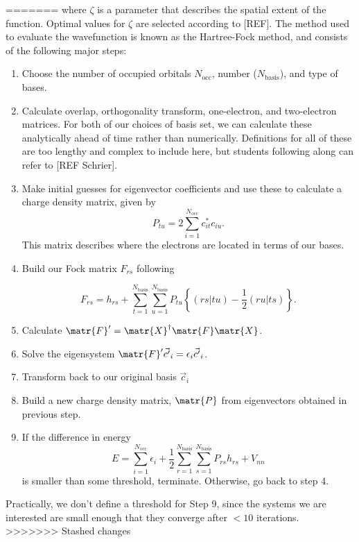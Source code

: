 \documentclass[journal=jacsat,manuscript=communication]{achemso}
\begin{document}
\begin{Abstract}
=======
where $\zeta$ is a parameter that describes the spatial extent of the function.  Optimal values for $\zeta$ are selected according to [REF].  The method used to evaluate the wavefunction is known as the Hartree-Fock method, and consists of the following major steps:
\begin{enumerate}
	\item Choose the number of occupied orbitals $N_\mathrm{occ}$, number ($N_\mathrm{basis}$), and type of bases.
	\item Calculate overlap, orthogonality transform, one-electron, and two-electron matrices.  For both of our choices of basis set, we can calculate these analytically ahead of time rather than numerically.  Definitions for all of these are too lengthy and complex to include here, but students following along can refer to [REF Schrier].
	\item Make initial guesses for eigenvector coefficients and use these to calculate a charge density matrix, given by
\begin{equation}
	P_{tu} = 2 \sum_{i=1}^{N_{\mathrm{occ}}}c^*_{it}c_{iu}.
\end{equation}
	This matrix describes where the electrons are located in terms of our bases.
	\item Build our Fock matrix $F_{rs}$ following

\begin{equation}
	F_{rs} = h_{rs} + \sum_{t=1}^{N_\mathrm{basis}}\sum_{u=1}^{N_\mathrm{basis}}P_{tu}\left\{(rs|tu) -\frac{1}{2}(ru|ts)\right\}.
\end{equation}
	\item Calculate $\matr{F}' = \matr{X}^\dag\matr{F}\matr{X}$.
	\item Solve the eigensystem $\matr{F}'\vec{c'}_i=\epsilon_i\vec{c'}_i$.
	\item Transform back to our original basis $\vec{c}_i$
	\item Build a new charge density matrix, $\matr{P}$ from eigenvectors obtained in previous step.
	\item If the difference in energy 
\begin{equation}
	E = \sum_{i=1}^{N_\mathrm{occ}}\epsilon_i + \frac{1}{2} \sum_{r=1}^{N_\mathrm{basis}} \sum_{s=1}^{N_\mathrm{basis}}P_{rs}h_{rs}+V_{nn}
	\label{eq:hf_energy}
\end{equation}
is smaller than some threshold, terminate.  Otherwise, go back to step 4.
\end{enumerate}
Practically, we don't define a threshold for Step 9, since the systems we are interested are small enough that they converge after $<10$ iterations. 
>>>>>>> Stashed changes


\end{Abstract}
\end{document}
